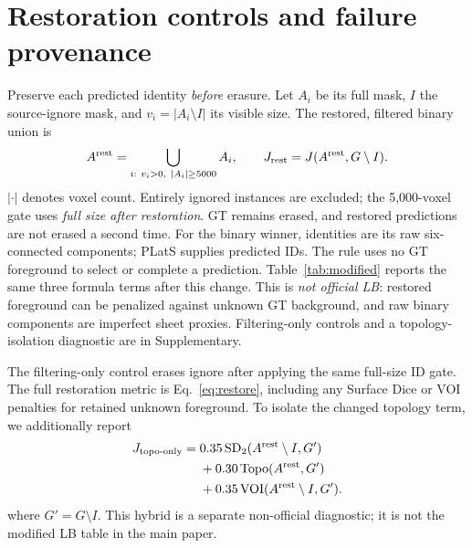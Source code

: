 \section{Restoration controls and failure provenance}
Preserve each predicted identity \emph{before} erasure. Let $A_i$ be its full
mask, $I$ the source-ignore mask, and $v_i=|A_i\setminus I|$ its visible size.
The restored, filtered binary union is
\begin{equation}
 A^{\rm rest}=\bigcup_{i:\ v_i>0,\ |A_i|\ge5000} A_i,\qquad
 J_{\rm rest}=J(A^{\rm rest},G\setminus I).
 \label{eq:restore}
\end{equation}
$|\cdot|$ denotes voxel count. Entirely ignored instances are excluded; the
5,000-voxel gate uses \emph{full size after restoration}. GT remains erased,
and restored predictions are not erased a second time. For the binary winner,
identities are its raw six-connected components; PLatS supplies predicted IDs.
The rule uses no GT foreground to select or complete a prediction.
Table~\ref{tab:modified} reports the same three formula terms after this change.
This is \emph{not official LB}: restored foreground can be penalized against
unknown GT background, and raw binary components are imperfect sheet proxies.
Filtering-only controls and a topology-isolation diagnostic are in Supplementary.



The filtering-only control erases ignore after applying the same full-size
ID gate. The full restoration metric is Eq.~\ref{eq:restore}, including any
Surface Dice or VOI penalties for retained unknown foreground. To isolate the
changed topology term, we additionally report
\begin{align}
 J_{\rm topo\text{-}only}={}&0.35\,\mathrm{SD}_2(A^{\rm rest}\setminus I,G')\nonumber\\
 &+0.30\,\mathrm{Topo}(A^{\rm rest},G')\nonumber\\
 &+0.35\,\mathrm{VOI}(A^{\rm rest}\setminus I,G').
\end{align}
where $G'=G\setminus I$. This hybrid is a separate non-official diagnostic;
it is not the modified LB table in the main paper.


